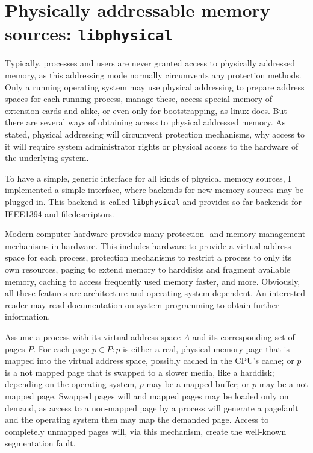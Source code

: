 %
%

\section{Physically addressable memory sources: \texttt{libphysical}}

Typically, processes and users are never granted access to physically addressed
memory, as this addressing mode normally circumvents any protection methods.
Only a running operating system may use physical addressing to prepare address
spaces for each running process, manage these, access special memory of
extension cards and alike, or even only for bootstrapping, as linux does. But
there are several ways of obtaining access to physical addressed memory. As
stated, physical addressing will circumvent protection mechanisms, why access to
it will require system administrator rights or physical access to the hardware
of the underlying system.

To have a simple, generic interface for all kinds of physical memory sources, I
implemented a simple interface, where backends for new memory sources may be
plugged in. This backend is called \texttt{libphysical} and provides so far
backends for IEEE1394 and filedescriptors.

Modern computer hardware provides many protection- and memory management
mechanisms in hardware. This includes hardware to provide a virtual address
space for each process, protection mechanisms to restrict a process to only its
own resources, paging to extend memory to harddisks and fragment available
memory, caching to access frequently used memory faster, and more. Obviously,
all these features are architecture and operating-system dependent. An
interested reader may read documentation on system programming to obtain further
information.

Assume a process with its virtual address space $A$ and its corresponding set
of pages $P$. For each page $p \in P: p$ is either a real, physical memory page
that is mapped into the virtual address space, possibly cached in the CPU's
cache; or $p$ is a not mapped page that is swapped to a slower media, like a
harddisk; depending on the operating system, $p$ may be a mapped buffer; or $p$
may be a not mapped page. Swapped pages will and mapped pages may be loaded
only on demand, as access to a non-mapped page by a process will generate a
pagefault and the operating system then may map the demanded page.  Access to
completely unmapped pages will, via this mechanism, create the well-known
segmentation fault.

